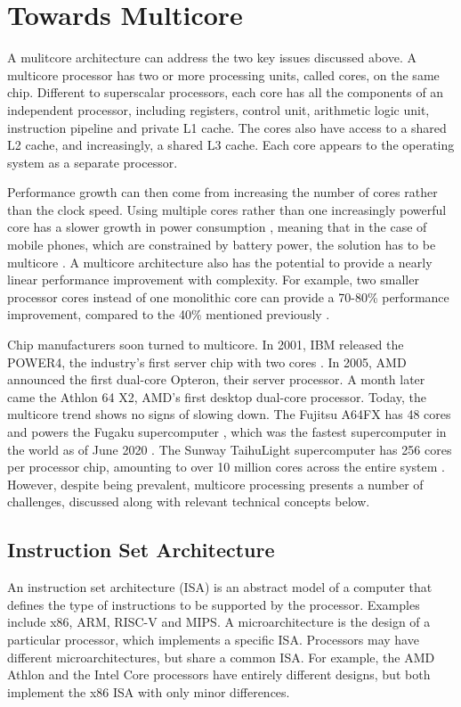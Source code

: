 \documentclass[bsc,frontabs,twoside,singlespacing,parskip,deptreport]{infthesis}     %
\begin{document}
\section{Towards Multicore} \label{towards-multicore}
A mulitcore architecture can address the two key issues discussed above. A multicore processor has two or more processing units, called cores, on the same chip. Different to superscalar processors, each core has all the components of an independent processor, including registers, control unit, arithmetic logic unit, instruction pipeline and private L1 cache. The cores also have access to a shared L2 cache, and increasingly, a shared L3 cache. Each core appears to the operating system as a separate processor. 

Performance growth can then come from increasing the number of cores rather than the clock speed. Using multiple cores rather than one increasingly powerful core has a slower growth in power consumption \cite{blake_2009}, meaning that in the case of mobile phones, which are constrained by battery power, the solution has to be multicore \cite{berkel_2009}. A multicore architecture also has the potential to provide a nearly linear performance improvement with complexity. For example, two smaller processor cores instead of one monolithic core can provide a 70-80\% performance improvement, compared to the 40\% mentioned previously \cite{borkar_2007}.

Chip manufacturers soon turned to multicore. In 2001, IBM released the POWER4, the industry’s first server chip with two cores \cite{power4}. In 2005, AMD announced the first dual-core Opteron, their server processor. A month later came the Athlon 64 X2, AMD’s first desktop dual-core processor. Today, the multicore trend shows no signs of slowing down. The Fujitsu A64FX has 48 cores and powers the Fugaku supercomputer \cite{a64fx}, which was the fastest supercomputer in the world as of June 2020 \cite{top500}. The Sunway TaihuLight supercomputer has 256 cores per processor chip, amounting to over 10 million cores across the entire system \cite{sunway}. However, despite being prevalent, multicore processing presents a number of challenges, discussed along with relevant technical concepts below.

\subsection{Instruction Set Architecture} \label{architectural-challenges}
An instruction set architecture (ISA) is an abstract model of a computer that defines the type of instructions to be supported by the processor. Examples include x86, ARM, RISC-V and MIPS. A microarchitecture is the design of a particular processor, which implements a specific ISA. Processors may have different microarchitectures, but share a common ISA. For example, the AMD Athlon and the Intel Core processors have entirely different designs, but both implement the x86 ISA with only minor differences.
\end{document}
